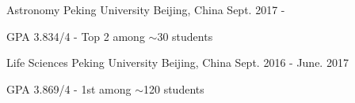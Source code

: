 


\begin{cventries}


\cventry
{Astronomy} %
{Peking University} %
{Beijing, China} %
{Sept. 2017 - } %
{ %
	\begin{cvitems}
		\item {GPA 3.834/4 - Top 2 among $\sim$30 students}
	\end{cvitems}
}

\cventry
{Life Sciences} %
{Peking University} %
{Beijing, China} %
{Sept. 2016 - June. 2017} %
{ %
	\begin{cvitems}
		\item {GPA 3.869/4 - 1st among $\sim$120 students}
	\end{cvitems}
}


\end{cventries}